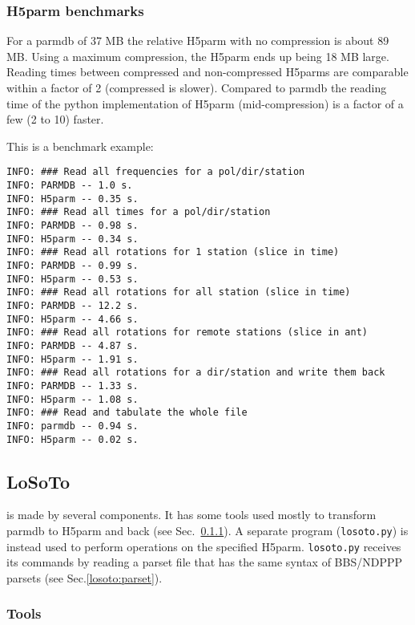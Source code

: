 \documentclass[structabstract]{article}
\begin{document}
\subsubsection{H5parm benchmarks}

For a parmdb of 37 MB the relative H5parm with no compression is about 89 MB. Using a maximum compression, the H5parm ends up being 18 MB large. Reading times between compressed and non-compressed H5parms are comparable within a factor of 2 (compressed is slower). Compared to parmdb the reading time of the python implementation of H5parm (mid-compression) is a factor of a few (2 to 10) faster.

This is a benchmark example:

\begin{verbatim}
INFO: ### Read all frequencies for a pol/dir/station
INFO: PARMDB -- 1.0 s.
INFO: H5parm -- 0.35 s.
INFO: ### Read all times for a pol/dir/station
INFO: PARMDB -- 0.98 s.
INFO: H5parm -- 0.34 s.
INFO: ### Read all rotations for 1 station (slice in time)
INFO: PARMDB -- 0.99 s.
INFO: H5parm -- 0.53 s.
INFO: ### Read all rotations for all station (slice in time)
INFO: PARMDB -- 12.2 s.
INFO: H5parm -- 4.66 s.
INFO: ### Read all rotations for remote stations (slice in ant)
INFO: PARMDB -- 4.87 s.
INFO: H5parm -- 1.91 s.
INFO: ### Read all rotations for a dir/station and write them back
INFO: PARMDB -- 1.33 s.
INFO: H5parm -- 1.08 s.
INFO: ### Read and tabulate the whole file
INFO: parmdb -- 0.94 s.
INFO: H5parm -- 0.02 s.
\end{verbatim}

\subsection{LoSoTo}
\label{losoto:overview}

\losoto{} is made by several components. It has some tools used mostly to transform parmdb to H5parm and back (see Sec.~\ref{losoto:tools}). A separate program (\texttt{losoto.py}) is instead used to perform operations on the specified H5parm. \texttt{losoto.py} receives its commands by reading a parset file that has the same syntax of BBS/NDPPP parsets (see Sec.\ref{losoto:parset}).

\subsubsection{Tools}
\label{losoto:tools}
\end{document}
